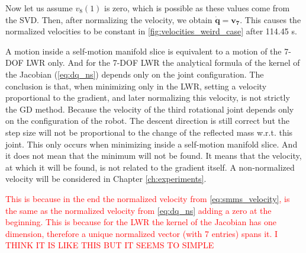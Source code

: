 Now let us assume  $v_8(1)$ is zero, which is possible as these values come from the SVD. Then, after normalizing the velocity, we obtain $\mathbf{\dot{q} =v_7 }$. This causes the normalized velocities to be constant in  \ref{fig:velocities_weird_case} after 114.45 s.

A motion inside a self-motion manifold slice is equivalent to a motion of the 7-DOF LWR only. And for the 7-DOF LWR the analytical formula of the kernel of the Jacobian (\ref{eq:dq_ns}) depends only on the joint configuration.
The conclusion is that, when minimizing only in the LWR, setting a velocity proportional to the gradient, and later normalizing this velocity, is not strictly the GD method. Because the velocity of the third rotational joint depends only on the configuration of the robot. The descent direction is still correct but the step size will not be proportional to the change of the reflected mass w.r.t. this joint. 
This only occurs when minimizing inside a self-motion manifold slice. And it does not mean that the minimum will not be found. It means that the velocity, at which it will be found, is not related to the gradient itself.
A non-normalized velocity will be considered in  Chapter  \ref{ch:experiments}.

\textcolor{red}{This is because in the end the normalized velocity from \ref{eq:smms_velocity}, is the same as the normalized velocity from \ref{eq:dq_ns} adding a zero at the beginning. This is because for the LWR the kernel of the Jacobian has one dimension, therefore a unique normalized vector (with 7 entries) spans it. I THINK IT IS LIKE THIS BUT IT SEEMS TO SIMPLE}




